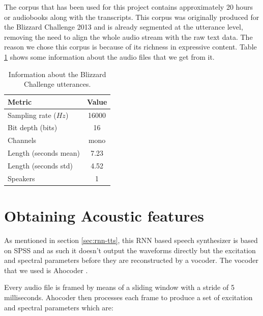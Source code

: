 The corpus that has been used for this project contains approximately 20 hours or audiobooks along with the transcripts. This corpus was originally produced for the Blizzard Challenge 2013 \cite{blizzard} and is already segmented at the utterance level, removing the need to align the whole audio stream with the raw text data. The reason we chose this corpus is because of its richness in expressive content. Table \ref{tab:blizard} shows some information about the audio files that we get from it.

\begin{table}[h]
    \centering
    \begin{tabular}{l|c}
        Metric & Value \\
        \hline
        Sampling rate ($Hz$) & 16000 \\
        Bit depth (bits) & 16 \\
        Channels & mono \\
        Length (seconds mean) & 7.23 \\
        Length (seconds std) & 4.52 \\
        Speakers & 1
    \end{tabular}
    \caption{Information about the Blizzard Challenge utterances.}
    \label{tab:blizard}
\end{table}


\section{Obtaining Acoustic features} \label{sec:aco-features}

As mentioned in section \ref{sec:rnn-tts}, this RNN based speech synthesizer is based on SPSS and as such it doesn't output the waveforms directly but the excitation and spectral parameters before they are reconstructed by a vocoder. The vocoder that we used is Ahocoder \cite{vocoder_ah}.

Every audio file is framed by means of a sliding window with a stride of 5 milliseconds. Ahocoder then processes each frame to produce a set of excitation and spectral parameters which are:


